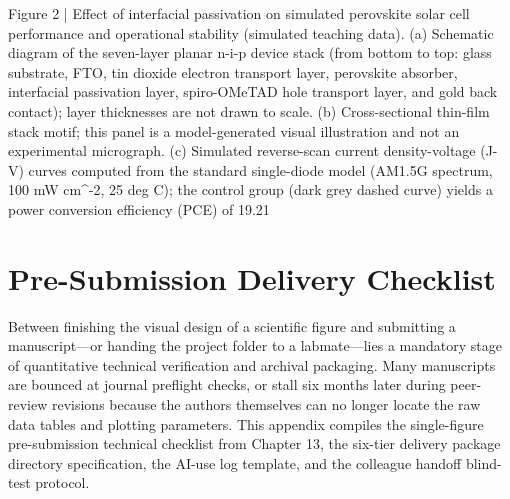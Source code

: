\begin{Prompt}
Figure 2 | Effect of interfacial passivation on simulated perovskite solar cell performance and operational stability (simulated teaching data). (a) Schematic diagram of the seven-layer planar n-i-p device stack (from bottom to top: glass substrate, FTO, tin dioxide electron transport layer, perovskite absorber, interfacial passivation layer, spiro-OMeTAD hole transport layer, and gold back contact); layer thicknesses are not drawn to scale. (b) Cross-sectional thin-film stack motif; this panel is a model-generated visual illustration and not an experimental micrograph. (c) Simulated reverse-scan current density-voltage (J-V) curves computed from the standard single-diode model (AM1.5G spectrum, 100 mW cm^-2, 25 deg C); the control group (dark grey dashed curve) yields a power conversion efficiency (PCE) of 19.21%
\end{Prompt}

\chapter{Pre-Submission Delivery Checklist}
\label{app:delivery-checklist}

Between finishing the visual design of a scientific figure and submitting a manuscript---or handing the project folder to a labmate---lies a mandatory stage of quantitative technical verification and archival packaging. Many manuscripts are bounced at journal preflight checks, or stall six months later during peer-review revisions because the authors themselves can no longer locate the raw data tables and plotting parameters. This appendix compiles the single-figure pre-submission technical checklist from Chapter 13, the six-tier delivery package directory specification, the AI-use log template, and the colleague handoff blind-test protocol.

